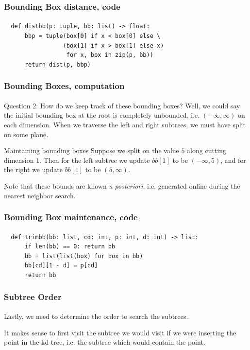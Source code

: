 \documentclass{beamer}                             %
\begin{document}
\begin{frame}[fragile]
\frametitle{Bounding Box distance, code}
\framesubtitle{}
\begin{verbatim}
  def distbb(p: tuple, bb: list) -> float:
      bbp = tuple(box[0] if x < box[0] else \
                 (box[1] if x > box[1] else x)
                  for x, box in zip(p, bb))
      return dist(p, bbp)
\end{verbatim}
\end{frame}

\begin{frame}
\frametitle{Bounding Boxes, computation}
\framesubtitle{}
Question 2: How do we keep track of these bounding boxes?
Well, we could say the initial bounding box at the root is completely unbounded,
i.e. \( (-\infty, \infty) \) on each dimension. When we traverse the
left and right subtrees, we must have split on some plane.

\begin{exampleblock}{Maintaining bounding boxes}
  Suppose we split on the value \( 5 \) along cutting dimension \( 1 \).
  Then for the left subtree we update \( bb[1] \) to be \( (-\infty, 5) \),
  and for the right we update \( bb[1] \) to be \( (5, \infty) \).
\end{exampleblock}

Note that these bounds are known \textit{a posteriori}, i.e. generated
online during the nearest neighbor search.
\end{frame}

\begin{frame}[fragile]
\frametitle{Bounding Box maintenance, code}
\framesubtitle{}
\begin{verbatim}
  def trimbb(bb: list, cd: int, p: int, d: int) -> list:
      if len(bb) == 0: return bb
      bb = list(list(box) for box in bb)
      bb[cd][1 - d] = p[cd]
      return bb
\end{verbatim}
\end{frame}

\begin{frame}
\frametitle{Subtree Order}
\framesubtitle{}
Lastly, we need to determine the order to search the subtrees.

It makes sense to first visit the subtree we would visit if we were inserting
the point in the kd-tree, i.e. the subtree which would contain the point.
\end{frame}
\end{document}
